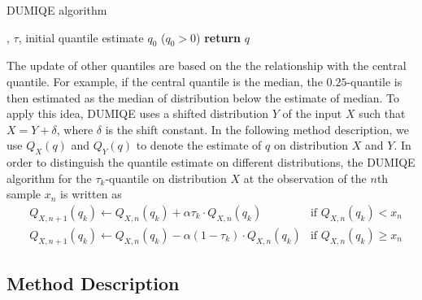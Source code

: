 \begin{algorithm}
    \caption{DUMIQE algorithm}\label{alg:DUMIQE}
    \begin{algorithmic}[1]
        , $\tau$, initial quantile estimate $q_0$ ($q_0 > 0$)
                                 
                              
                \Else                           
                \EndIf
            \EndFor
        \State \textbf{return} $q$              
    \end{algorithmic}
\end{algorithm}

The update of other quantiles are based on the the relationship with the central quantile. For example, if the central quantile is the median, the $0.25$-quantile is then estimated as the median of distribution below the estimate of median. To apply this idea, DUMIQE uses a shifted distribution $Y$ of the input $X$ such that $X = Y + \delta$, where $\delta$ is the shift constant. In the following method description, we use $Q_X(q)$ and  $Q_Y(q)$ to denote the estimate of $q$ on distribution $X$ and $Y$. In order to distinguish the quantile estimate on different distributions, the DUMIQE algorithm for the $\tau_k$-quantile on distribution $X$ at the observation of the $n$th sample $x_n$ is written as 
\begin{align}
        &Q_{X, n+1}(q_k) \leftarrow Q_{X, n}(q_k) + \alpha \tau_k \cdot Q_{X, n}(q_k)  & \text{if } Q_{X, n}(q_k) < x_n \\
        &Q_{X, n+1}(q_k) \leftarrow Q_{X, n}(q_k) - \alpha (1-\tau_k) \cdot Q_{X, n}(q_k)  & \text{if } Q_{X, n}(q_k) \geq x_n \nonumber
\end{align}

\subsection{Method Description}
\label{subsec: multi_shiftQ_description}

